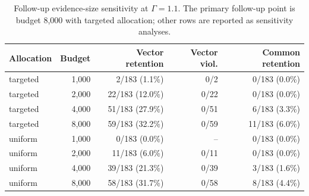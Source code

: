 \begin{table}[t]
\centering
\small
\begin{tabular}{@{}lrrrr@{}}
\toprule
Allocation & Budget & Vector retention & Vector viol. & Common retention \\
\midrule
targeted & 1,000 & 2/183 (1.1\%) & 0/2 & 0/183 (0.0\%) \\
targeted & 2,000 & 22/183 (12.0\%) & 0/22 & 0/183 (0.0\%) \\
targeted & 4,000 & 51/183 (27.9\%) & 0/51 & 6/183 (3.3\%) \\
targeted & 8,000 & 59/183 (32.2\%) & 0/59 & 11/183 (6.0\%) \\
uniform & 1,000 & 0/183 (0.0\%) & -- & 0/183 (0.0\%) \\
uniform & 2,000 & 11/183 (6.0\%) & 0/11 & 0/183 (0.0\%) \\
uniform & 4,000 & 39/183 (21.3\%) & 0/39 & 3/183 (1.6\%) \\
uniform & 8,000 & 58/183 (31.7\%) & 0/58 & 8/183 (4.4\%) \\
\bottomrule
\end{tabular}
\caption{Follow-up evidence-size sensitivity at $\Gamma=1.1$. The primary follow-up point is budget 8,000 with targeted allocation; other rows are reported as sensitivity analyses.}
\label{tab:controlled-followup-budget}
\end{table}
